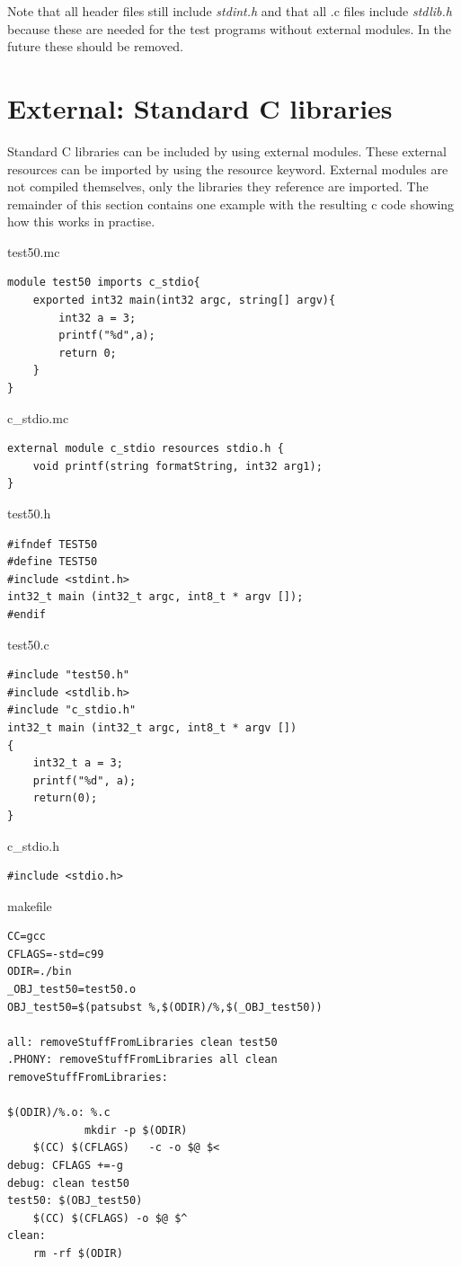 \documentclass[a4paper,10pt,titlepage]{report}
\begin{document}
Note that all header files still include \emph{stdint.h} and that all .c files include \emph{stdlib.h} because these are needed for the test programs without external modules. In the future these should be removed.

\section{External: Standard C libraries}
Standard C libraries can be included by using external modules. These external resources can be imported by using the resource keyword. External modules are not compiled themselves, only the libraries they reference are imported. The remainder of this section contains one example with the resulting c code showing how this works in practise.

{\setlength{\parindent}{0cm}

test50.mc
\begin{lstlisting}
module test50 imports c_stdio{
    exported int32 main(int32 argc, string[] argv){
        int32 a = 3;
        printf("%d",a);
        return 0;
    }
}
\end{lstlisting}

c\_stdio.mc
\begin{lstlisting}
external module c_stdio resources stdio.h {
    void printf(string formatString, int32 arg1);
}
\end{lstlisting}

test50.h
\begin{lstlisting}
#ifndef TEST50
#define TEST50
#include <stdint.h>
int32_t main (int32_t argc, int8_t * argv []);
#endif
\end{lstlisting}

test50.c
\begin{lstlisting}
#include "test50.h"
#include <stdlib.h>
#include "c_stdio.h"
int32_t main (int32_t argc, int8_t * argv [])
{
    int32_t a = 3;
    printf("%d", a);
    return(0);
}
\end{lstlisting}

c\_stdio.h
\begin{lstlisting}
#include <stdio.h>
\end{lstlisting}

makefile
\begin{lstlisting}
CC=gcc
CFLAGS=-std=c99
ODIR=./bin
_OBJ_test50=test50.o
OBJ_test50=$(patsubst %,$(ODIR)/%,$(_OBJ_test50))
 
all: removeStuffFromLibraries clean test50
.PHONY: removeStuffFromLibraries all clean
removeStuffFromLibraries:
  	
$(ODIR)/%.o: %.c
        	mkdir -p $(ODIR)
  	$(CC) $(CFLAGS)   -c -o $@ $< 
debug: CFLAGS +=-g
debug: clean test50
test50: $(OBJ_test50)
  	$(CC) $(CFLAGS) -o $@ $^  
clean:
  	rm -rf $(ODIR) 
\end{lstlisting}

}
\end{document}
